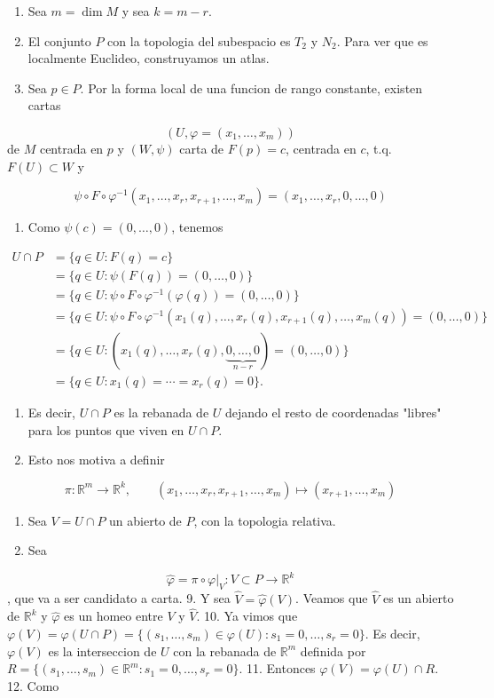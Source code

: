 \begin{bookproof}{}
\begin{enumerate}
\item Sea $m=\dim M$ y sea $k=m-r$.
\item El conjunto $P$ con la topologia del subespacio es $T_2$ y $N_2$. Para ver que es localmente Euclideo, construyamos un atlas.
\item Sea $p\in P$. Por la forma local de una funcion de rango constante, existen cartas
\end{enumerate}
\[
(U,\varphi=(x_1,\ldots,x_m))
\]
de $M$ centrada en $p$ y $(W,\psi)$ carta de $F(p)=c$, centrada en $c$, t.q. $F(U)\subset W$ y

\[
\psi\circ F\circ\varphi^{-1}(x_1,\ldots,x_r,x_{r+1},\ldots,x_m)=(x_1,\ldots,x_r,0,\ldots,0)
\]
\begin{enumerate}[start=4]
\item Como $\psi(c)=(0,\ldots,0)$, tenemos
\end{enumerate}
\[
\begin{aligned}U\cap P &=\{q\in U:F(q)=c\}\\ &=\{q\in U:\psi(F(q))=(0,\ldots,0)\}\\&=\{q\in U:\psi\circ F\circ \varphi^{-1}(\varphi(q))=(0,\ldots,0)\}\\&=\{q\in U:\psi\circ F\circ \varphi^{-1}(x_1(q),\ldots,x_r(q),x_{r+1}(q),\ldots,x_m(q))=(0,\ldots,0)\}\\&=\{q\in U:(x_1(q),\ldots,x_r(q),\underbrace{0,\ldots,0}_{n-r})=(0,\ldots,0)\}\\&=\{q\in U:x_1(q)=\cdots=x_r(q)=0\}.\end{aligned}
\]
\begin{enumerate}[start=5]
\item Es decir, $U\cap P$ es la rebanada de $U$ dejando el resto de coordenadas "libres" para los puntos que viven en $U\cap P$.
\item Esto nos motiva a definir
\end{enumerate}
\[
\pi:\mathbb R^m\to\mathbb R^k,\qquad(x_1,\ldots,x_r,x_{r+1},\ldots,x_m)\mapsto(x_{r+1},\ldots,x_m)
\]
\begin{enumerate}[start=7]
\item Sea $V=U\cap P$ un abierto de $P$, con la topologia relativa.
\item Sea
\end{enumerate}
\[
\widehat\varphi=\pi\circ\varphi|_V:V\subset P\to\mathbb R^k
\]
, que va a ser candidato a carta. 9. Y sea $\hat{V}=\hat{\varphi}(V)$. Veamos que $\hat{V}$ es un abierto de $\mathbb{R}^{k}$ y $\widehat\varphi$ es un homeo entre $V$ y $\widehat V$. 10. Ya vimos que $\varphi(V)=\varphi(U\cap P)=\{(s_1,\ldots,s_m)\in\varphi(U):s_1=0,\ldots,s_r=0\}$. Es decir, $\varphi(V)$ es la interseccion de $U$ con la rebanada de $\mathbb R^m$ definida por $R=\{(s_1,\ldots,s_m)\in\mathbb R^m:s_1=0,\ldots,s_r=0\}$. 11. Entonces $\varphi(V)=\varphi(U)\cap R$. 12. Como


\end{bookproof}
